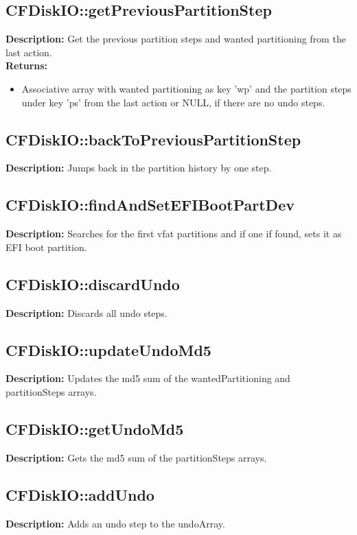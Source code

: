 \subsection{CFDiskIO::getPreviousPartitionStep}
\textbf{Description:} Get the previous partition steps and wanted partitioning from the last action.\\
\textbf{Returns:}
\begin{itemize}
\item Associative array with wanted partitioning as key 'wp' and the partition steps under key 'ps' from the last action or NULL, if there are no undo steps.
\end{itemize}

\subsection{CFDiskIO::backToPreviousPartitionStep}
\textbf{Description:} Jumps back in the partition history by one step.\\

\subsection{CFDiskIO::findAndSetEFIBootPartDev}
\textbf{Description:} Searches for the first vfat partitions and if one if found, sets it as EFI boot partition.\\

\subsection{CFDiskIO::discardUndo}
\textbf{Description:} Discards all undo steps.\\

\subsection{CFDiskIO::updateUndoMd5}
\textbf{Description:} Updates the md5 sum of the wantedPartitioning and partitionSteps arrays.\\

\subsection{CFDiskIO::getUndoMd5}
\textbf{Description:} Gets the md5 sum of the partitionSteps arrays.\\

\subsection{CFDiskIO::addUndo}
\textbf{Description:} Adds an undo step to the undoArray.\\


